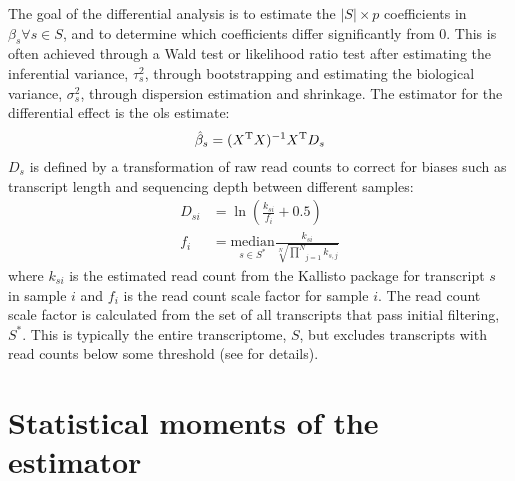 The goal of the differential analysis is to estimate the $|S| \times p$ coefficients in $\beta_s \forall s \in S$, and to determine which coefficients differ significantly from 0.
This is often achieved through a Wald test or likelihood ratio test after estimating the inferential variance, $\tau_s^2$, through bootstrapping and estimating the biological variance, $\sigma_s^2$, through dispersion estimation and shrinkage.
The estimator for the differential effect is the \gls{ols} estimate:
%
\begin{equation}
  \hat{\beta}_s = (X^{\mathrm{T}} X)^{-1} X^{\mathrm{T}} D_s
\end{equation}
%
$D_s$ is defined by a transformation of raw read counts to correct for biases such as transcript length and sequencing depth between different samples:
%
\begin{align}
  D_{si}   & = \ln \left(\frac{k_{si}}{f_i} + 0.5 \right)                                                            \\
  f_i & = \underset{s \in S^*}{\mathrm{median}} \frac{k_{si}}{\sqrt[N]{\underset{j = 1}{\overset{N}{\prod }}k_{s,j}}}
\end{align}
%
where $k_{si}$ is the estimated read count from the Kallisto package \cite{brayNearoptimalProbabilisticRNAseq2016} for transcript $s$ in sample $i$ and $f_i$ is the read count scale factor for sample $i$.
The read count scale factor is calculated from the set of all transcripts that pass initial filtering, $S^*$.
This is typically the entire transcriptome, $S$, but excludes transcripts with read counts below some threshold (see \cite[REF][]{pimentelDifferentialAnalysisRNAseq2017} for details).

\section{Statistical moments of the  estimator}

